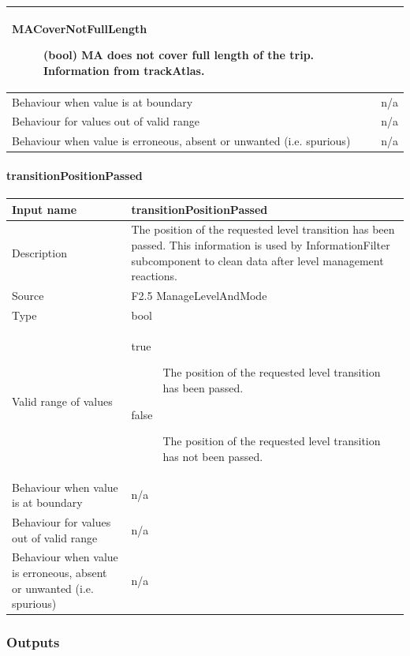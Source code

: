 \begin{longtable}{p{}p{}}
\begin{description}
\item[MACoverNotFullLength](bool) MA does not cover full length of the trip. Information from trackAtlas.
\end{description}\\
\midrule
Behaviour when value is at boundary	& n/a\\
\midrule
Behaviour for values out of valid range	& n/a\\
\midrule
Behaviour when value is erroneous, absent or unwanted (i.e. spurious) & n/a\\
\bottomrule
\end{longtable}

\paragraph{transitionPositionPassed}

\begin{longtable}{p{}p{}}
\toprule
Input name				& transitionPositionPassed \\
\midrule
Description				& The position of the requested level transition has been passed. This information is used by InformationFilter subcomponent to clean data after level management reactions.
\\
\midrule
Source					& F2.5 ManageLevelAndMode\\ 
\midrule
Type					& bool\\
\midrule
Valid range of values	& 
\begin{description}
\item[true] The position of the requested level transition has been passed.
\item[false] The position of the requested level transition has not been passed.
\end{description}\\
\midrule
Behaviour when value is at boundary	& n/a\\
\midrule
Behaviour for values out of valid range	& n/a\\
\midrule
Behaviour when value is erroneous, absent or unwanted (i.e. spurious) & n/a\\
\bottomrule
\end{longtable}



\subsubsection{Outputs}\label{s:Manage_Trackside_outputs}

